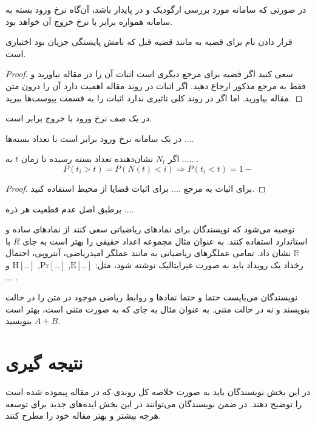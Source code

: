 \documentclass{CCI2020}
\begin{document}
\begin{theorem}
در صورتی که سامانه مورد بررسی ارگودیک و در پایدار باشد، آن‌گاه نرخ ورود بسته به سامانه همواره برابر با نرخ خروج آن خواهد بود. 
\label{theorem:jddkssskaa}
\end{theorem}
\begin{theorem}
قرار دادن نام برای قضیه به مانند قضیه قبل که نامش پایستگی جریان بود اختیاری است.
\label{theorem:jdtysssaa}
\end{theorem}
\begin{proof}
سعی کنید اگر قضیه برای مرجع دیگری است اثبات آن را در مقاله نیاورید و فقط به مرجع مذکور ارجاع دهید. اگر اثبات در روند مقاله اهمیت دارد آن را درون متن مقاله بیاورید. اما اگر در روند کلی تاثیری ندارد اثبات را به قسمت پیوست‌ها ببرید. 
\end{proof}
\begin{corollary}
در یک صف نرخ ورود با خروج برابر است.
\end{corollary}
\begin{corollary}
در یک سامانه نرخ ورود برابر است با تعداد بسته‌ها ....
\end{corollary}
\begin{lemma}
   اگر $N_t$ نشان‌دهنده تعداد بسته رسیده تا زمان $t$ به .......
\begin{equation}
P(t_{i}>t)=P(N(t)<i)\Longrightarrow P(t_{i}<t)=1-
\end{equation}

\end{lemma}%
\begin{proof}
برای اثبات به مرجع .... برای اثبات قضایا از محیط 
 استفاده کنید.
\end{proof}

\begin{principle}
برطبق اصل عدم قطعیت هر ذره ....
\end{principle}

توصیه می‌شود که نویسندگان برای نمادهای ریاضیاتی سعی کنند از نمادهای ساده و استاندارد استفاده کنند. به عنوان مثال مجموعه اعداد حقیقی را بهتر است به جای
 $R$ با $\mathbb{R}$
  نشان داد. تمامی عملگرهای ریاضیاتی به مانند عملگر امیدریاضی، آنتروپی، احتمال رخداد یک رویداد باید به صورت غیرایتالیک نوشته شود، مثل:
$\mathrm{E}[..]$, $\mathrm{Pr}[..]$, $\mathrm{H}[..]$ و ... . 

نویسندگان می‌بایست حتما و حتما نمادها و روابط ریاضی موجود در متن را در حالت 
 بنویسند و نه در حالت متنی. به عنوان مثال به جای 
  که به صورت متنی است، بهتر است بنویسید $A+B$.
\section{نتیجه گیری}
در این بخش نویسندگان باید به صورت خلاصه کل روندی که در مقاله پیموده شده است را توضیح دهند. در ضمن نویسندگان می‌توانند در این بخش ایده‌های جدید برای توسعه هرچه بیشتر و بهتر مقاله خود را مطرح کنند.
\end{document}
